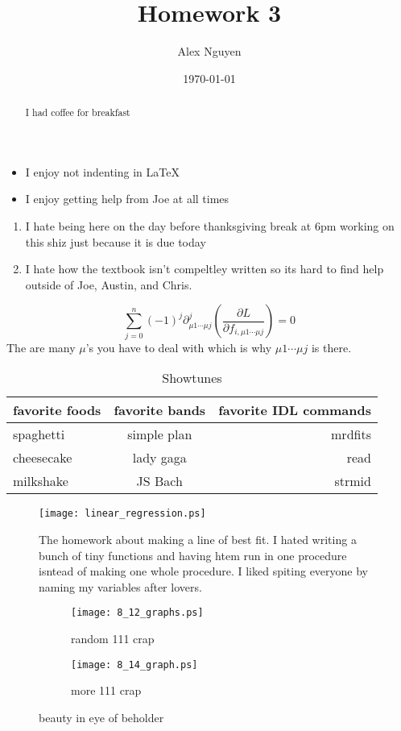 \documentclass[a4paper,twoside,10pt]{report}
\title{Homework 3}
\date{\today}
\author{Alex Nguyen}
\begin{document}
\maketitle
\begin{abstract}
I had coffee for breakfast
\end{abstract}
\begin{itemize}
\item I enjoy not indenting in \LaTeX
\item I enjoy getting help from Joe at all times
\end{itemize}
\begin{enumerate}
\item I hate being here on the day before thanksgiving break at 6pm
  working on this shiz just because it is due today
\item I hate how the textbook isn't compeltley written so its hard to
  find help outside of Joe, Austin, and Chris.
\end{enumerate}
\begin{equation}
\sum_{j=0}^{n}(-1)^{j} \partial^{j}_{\mu1 \dotsb \mu j} \left(\frac{\partial
  L}{\partial f_{i, \mu1 \dotsb \mu j}}\right)=0
\end{equation}  
The are many $\mu$'s you have to deal with which is why $\mu1 \dotsb \mu
j$ is there.
\\
\begin{table}[H]
\begin{tabular}{ | l | c | r | }
\hline
favorite foods & favorite bands & favorite IDL commands \\
\hline
spaghetti & simple plan & mrdfits \\
cheesecake & lady gaga & read \\
milkshake & JS Bach & strmid \\
\hline
\end{tabular}
\caption{Showtunes}
\end{table}
\begin{figure}[H]
\centering
\texttt{[image: linear\_regression.ps]}
\caption{The homework about making a line of best fit. I hated writing a
  bunch of tiny functions and having htem run in one procedure isntead
  of making one whole procedure. I liked spiting everyone by naming my
  variables after lovers.}
\end{figure}
\begin{figure}
\centering

\begin{subfigure}[H]{0.4\textwidth}
\texttt{[image: 8\_12\_graphs.ps]}
\caption{random 111 crap}
\end{subfigure}
\begin{subfigure}[H]{0.4\textwidth}
\texttt{[image: 8\_14\_graph.ps]}
\caption{more 111 crap}
\end{subfigure}
\caption{beauty in eye of beholder}
\end{figure}
\end{document}
